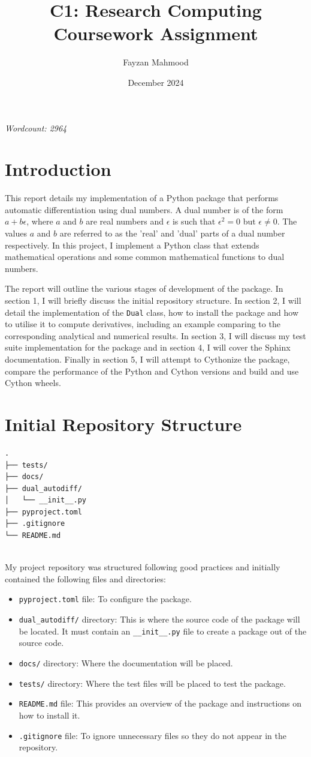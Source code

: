 \documentclass{article}
\title{C1: Research Computing Coursework Assignment}
\author{Fayzan Mahmood}
\date{December 2024}
\begin{document}
\maketitle
\textit{Wordcount: 2964}

\section*{Introduction}
This report details my implementation of a Python package that performs automatic differentiation using dual numbers. A dual number is of the form $a+b\epsilon$, where $a$ and $b$ are real numbers and $\epsilon$ is such that $\epsilon^2=0$ but $\epsilon \neq 0$. The values $a$ and $b$ are referred to as the 'real' and 'dual' parts of a dual number respectively. In this project, I implement a Python class that extends mathematical operations and some common mathematical functions to dual numbers. 

The report will outline the various stages of development of the package. In section 1, I will briefly discuss the initial repository structure. In section 2, I will detail the implementation of the \texttt{Dual} class, how to install the package and how to utilise it to compute derivatives, including an example comparing to the corresponding analytical and numerical results. In section 3, I will discuss my test suite implementation for the package and in section 4, I will cover the Sphinx documentation. Finally in section 5, I will attempt to Cythonize the package, compare the performance of the Python and Cython versions and build and use Cython wheels.

\section{Initial Repository Structure}

\begin{verbatim}
.
├── tests/
├── docs/
├── dual_autodiff/
│   └── __init__.py
├── pyproject.toml
├── .gitignore 
└── README.md
        
\end{verbatim}  

My project repository was structured following good practices and initially contained the following files and directories:
\begin{itemize}
    \item \texttt{pyproject.toml} file: To configure the package.
    \item \texttt{dual\_autodiff/} directory: This is where the source code of the package will be located. It must contain an \texttt{\_\_init\_\_.py} file to create a package out of the source code.
    \item \texttt{docs/} directory: Where the documentation will be placed.
    \item \texttt{tests/} directory: Where the test files will be placed to test the package.
    \item \texttt{README.md} file: This provides an overview of the package and instructions on how to install it.
    \item \texttt{.gitignore} file: To ignore unnecessary files so they do not appear in the repository.
\end{itemize}
\end{document}
